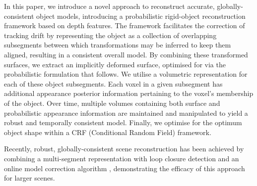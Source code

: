 
In this paper, we introduce a novel approach to reconstruct accurate, globally-consistent object models, introducing a probabilistic rigid-object reconstruction 
framework based on depth features. The framework facilitates the correction of tracking drift by representing the object as a
collection of overlapping subsegments between which transformations may be inferred to keep them aligned, resulting in a consistent
overall model. By combining these transformed surfaces, we extract an implicitly deformed surface, optimised for via the probabilistic formulation 
that follows. We utilise a volumetric representation for each of these object subsegments. Each voxel in a given subsegment has additional appearance posterior 
information pertaining to the voxel's membership of the object. Over time, multiple volumes containing both surface and probabilistic appearance information are 
maintained and manipulated to yield a robust and temporally consistent model. Finally, we optimise for the optimum object shape within a CRF 
(Conditional Random Field) framework.

Recently, robust, globally-consistent scene reconstruction has been achieved by combining a multi-segment representation with loop closure detection and an online model correction algorithm \cite{Kahler2016}, demonstrating the efficacy of this approach for larger scenes.


